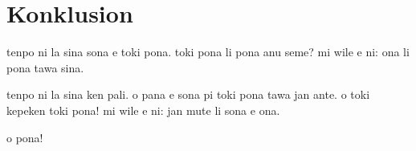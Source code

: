 \section{Konklusion}
%

tenpo ni la sina sona e toki pona. 
toki pona li pona anu seme?
mi wile e ni: ona li pona tawa sina.

tenpo ni la sina ken pali. 
o pana e sona pi toki pona tawa jan ante.  
o toki kepeken toki pona! 
mi wile e ni: jan mute li sona e ona. 

o pona!

